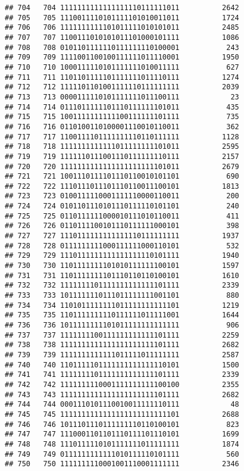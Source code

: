 \documentclass[]{article}
\begin{document}
\begin{verbatim}
## 704   704 1111111111111111110111111011          2642
## 705   705 1110011110101111101010011011          1724
## 706   706 1111111111101011111010101011          2485
## 707   707 1100111010101011101000101111          1086
## 708   708 0101101111110111111110100001           243
## 709   709 1111001100100111111011110001          1950
## 710   710 1000111110101111111010011111           627
## 711   711 1101101111101111111011110111          1274
## 712   712 1111101101001111110111111111          2039
## 713   713 0000111110101111111011100111            23
## 714   714 0111011111101110111111101011           435
## 715   715 1001111111111100111111101111           735
## 716   716 0110100110100001110010110011           362
## 717   717 1100111101111111110110111111          1128
## 718   718 1111111111111011111111101011          2595
## 719   719 1111110111001110111111110111          2157
## 720   720 1111111111111111111111101011          2679
## 721   721 1001110111101110110010101101           690
## 722   722 1110111011101110110011100101          1813
## 723   723 0100111110001111110000110011           200
## 724   724 0101101110101110111110101101           240
## 725   725 0110111111000010111010110011           411
## 726   726 0110111100101110111111000101           398
## 727   727 1110111111111111110111111111          1937
## 728   728 0111111111000111111000110101           532
## 729   729 1110111111111111111110101111          1940
## 730   730 1101111111101010111111100101          1597
## 731   731 1101111111101110110110100101          1610
## 732   732 1111111101111111111111101111          2339
## 733   733 1011111110111011111111001101           880
## 734   734 1101011111111011111111111101          1219
## 735   735 1101111111110111111011111001          1644
## 736   736 1011111111101011111111111111           906
## 737   737 1111111100111111111111101111          2259
## 738   738 1111111111111111111111101111          2682
## 739   739 1111111111111011111011111111          2587
## 740   740 1101111101111111111111110101          1500
## 741   741 1111111101111111111111101111          2339
## 742   742 1111111110001111111111100100          2355
## 743   743 1111111111111111111111101111          2682
## 744   744 0001110101110010011111110111            48
## 745   745 1111111111111111111111111101          2688
## 746   746 1011101110111111110110100101           823
## 747   747 1110001101101110111101110101          1699
## 748   748 1110111110101111111011111111          1874
## 749   749 0111111111111010111110101111           560
## 750   750 1111111110001001110001111111          2346

\end{verbatim}
\end{document}
